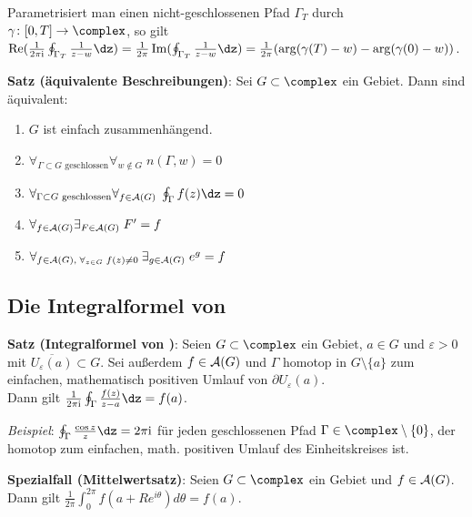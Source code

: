 Parametrisiert man einen nicht-geschlossenen Pfad
$\Gamma_T$ durch $\gamma\colon [0, T] \rightarrow \complex$, so gilt\\
$\Re(\frac{1}{2\pi\i} \oint_{\Gamma_T} \frac{1}{z - w} \dz) =
\frac{1}{2\pi} \Im(\oint_{\Gamma_T} \frac{1}{z - w} \dz) =
\frac{1}{2\pi} (\arg(\gamma(T) - w) - \arg(\gamma(0) - w))$.

\textbf{Satz (äquivalente Beschreibungen)}:
Sei $G \subset \complex$ ein Gebiet.
Dann sind äquivalent:
\begin{enumerate}
    \item
    $G$ ist einfach zusammenhängend.

    \item
    $\forall_{\Gamma \subset G \text{ geschlossen}} \forall_{w \notin G}\;
    n(\Gamma, w) = 0$

    \item
    $\forall_{\Gamma \subset G \text{ geschlossen}} \forall_{f \in \A(G)}\;
    \oint_\Gamma f(z)\dz = 0$

    \item
    $\forall_{f \in \mathcal{A}(G)} \exists_{F \in \mathcal{A}(G)}\; F' = f$

    \item
    $\forall_{f \in \mathcal{A}(G),\; \forall_{z \in G}\; f(z) \not= 0\;}
    \exists_{g \in \mathcal{A}(G)}\; e^g = f$
\end{enumerate}

\subsection{%
    Die Integralformel von %
}

\textbf{Satz (Integralformel von )}:
Seien $G \subset \complex$ ein Gebiet, $a \in G$ und $\varepsilon > 0$
mit $\overline{U_\varepsilon(a)} \subset G$.
Sei außerdem $f \in \mathcal{A}(G)$ und $\Gamma$ homotop in
$G \setminus \{a\}$ zum einfachen, mathematisch positiven Umlauf von
$\partial U_\varepsilon(a)$.\\
Dann gilt $\frac{1}{2\pi\i} \oint_\Gamma \frac{f(z)}{z - a} \dz = f(a)$.

\emph{Beispiel}:
$\oint_\Gamma \frac{\cos z}{z} \dz = 2\pi\i$ für jeden geschlossenen Pfad
$\Gamma \in \complex \setminus \{0\}$, der homotop zum einfachen,
math. positiven Umlauf des Einheitskreises ist.

\textbf{Spezialfall (Mittelwertsatz)}:
Seien $G \subset \complex$ ein Gebiet und $f \in \mathcal{A}(G)$.\\
Dann gilt $\frac{1}{2\pi} \int_0^{2\pi} f(a + Re^{i\theta}) d\theta = f(a)$.

